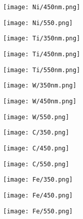 \documentclass{beamer}
\begin{document}
\begin{frame}
    \texttt{[image: Ni/450nm.png]}
\end{frame}

\begin{frame}
    \texttt{[image: Ni/550.png]}
\end{frame}

\begin{frame}
    \texttt{[image: Ti/350nm.png]}
\end{frame}

\begin{frame}
    \texttt{[image: Ti/450nm.png]}
\end{frame}

\begin{frame}
    \texttt{[image: Ti/550nm.png]}
\end{frame}

\begin{frame}
    \texttt{[image: W/350nm.png]}
\end{frame}

\begin{frame}
    \texttt{[image: W/450nm.png]}
\end{frame}

\begin{frame}
    \texttt{[image: W/550.png]}
\end{frame}

\begin{frame}
    \texttt{[image: C/350.png]}
\end{frame}

\begin{frame}
    \texttt{[image: C/450.png]}
\end{frame}

\begin{frame}
    \texttt{[image: C/550.png]}
\end{frame}

\begin{frame}
    \texttt{[image: Fe/350.png]}
\end{frame}

\begin{frame}
    \texttt{[image: Fe/450.png]}
\end{frame}

\begin{frame}
    \texttt{[image: Fe/550.png]}
\end{frame}
\end{document}
